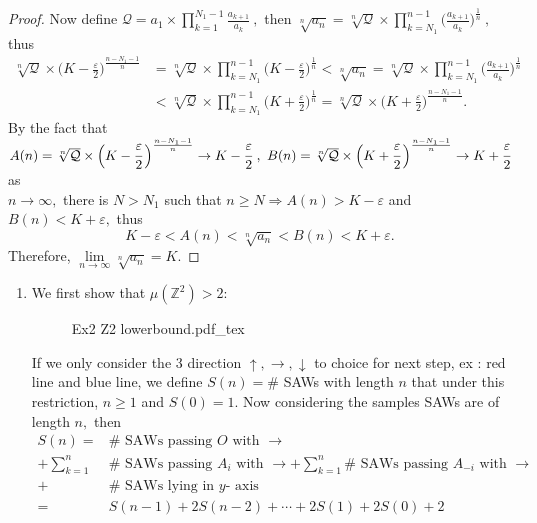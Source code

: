 \documentclass[12pt,a4paper]{article}
\newcommand{\incfig}[1]{%
{#1.pdf_tex}
}
\begin{document}
\begin{enumerate}
\begin{proof}
	Now define $\mathcal{Q}=a_1\times{\displaystyle \prod_{k=1}^{N_1-1} \frac{a_{k+1}}{a_k}}\ ,$ then $\sqrt[n]{a_n}=\sqrt[n]{\mathcal{Q}}\times {\displaystyle \prod_{k=N_1}^{n-1} \Big(\frac{a_{k+1}}{a_k}\Big)^{\frac{1}{n}}}\ , $ thus
	\begin{align*}
	    	\sqrt[n]{\mathcal{Q}}\times\Big(K-\frac{\varepsilon}{2}\Big)^{\frac{n-N_1-1}{n}}&= \sqrt[n]{\mathcal{Q}}\times{\displaystyle \prod_{k=N_1}^{n-1}\Big(K-\frac{\varepsilon}{2}\Big)^{\frac{1}{n}}}<\sqrt[n]{a_n}=\sqrt[n]{\mathcal{Q}}\times {\displaystyle \prod_{k=N_1}^{n-1} \Big(\frac{a_{k+1}}{a_k}\Big)^{\frac{1}{n}}}\\
	    	&<\sqrt[n]{\mathcal{Q}}\times{\displaystyle \prod_{k=N_1}^{n-1}\Big(K+\frac{\varepsilon}{2}\Big)^{\frac{1}{n}}}=\sqrt[n]{\mathcal{Q}}\times\Big(K+\frac{\varepsilon}{2}\Big)^{\frac{n-N_1-1}{n}}.
	\end{align*}
	By the fact that \\
	$A(n)=\sqrt[n]{\mathcal{Q}}\times\Big(K-\cfrac{\varepsilon}{2}\,\Big)^{\frac{n-N_1-1}{n}}\to K-\cfrac{\varepsilon}{2}\ ,\ B(n)=\sqrt[n]{\mathcal{Q}}\times\Big(K+\cfrac{\varepsilon}{2}\,\Big)^{\frac{n-N_1-1}{n}}\to K+\cfrac{\varepsilon}{2} $ as\\[3pt] $n\to\infty,$ there is $N>N_1$ such that $n\geq N\Rightarrow A(n)>K-\varepsilon$ and $B(n)<K+\varepsilon,$ thus 
	\[
	K-\varepsilon<A(n)<\sqrt[n]{a_n}<B(n)<K+\varepsilon.
	\]
	Therefore, $\lim\limits_{n\to\infty}\sqrt[n]{a_n}=K.$
	\end{proof}
	\begin{enumerate}
		\item We first show that $\mu(\mathbb{Z}^2)>2:$
		\begin{figure}[htp]
		\centering
		\def\svgwidth{8cm}
		\incfig{Ex2 Z2 lowerbound}
		\end{figure}
		\newpage
		If we only consider the 3 direction $\uparrow,\rightarrow,\downarrow$ to choice for next step, ex : red line and blue line, we define $S(n)=\#$ SAWs with length $n$ that under this restriction, $n\geq 1$ and $S(0)=1.$ Now considering the samples SAWs are of length $n,$ then 
		\begin{align*}
	    	S(n)=&\#\mbox{ SAWs passing } O\mbox{ with } \rightarrow\\
	    	+\sum_{k=1}^n &\#\mbox{ SAWs passing } A_i\mbox{ with } \rightarrow + \sum_{k=1}^n \#\mbox{ SAWs passing } A_{-i}\mbox{ with } \rightarrow\\
	    	+&\#\mbox{ SAWs lying in } y\mbox{- axis}\\
	    	=& S(n-1)+2S(n-2)+\cdots +2S(1)+2S(0)+2\\

\end{align*}
\end{enumerate}
\end{enumerate}
\end{document}
